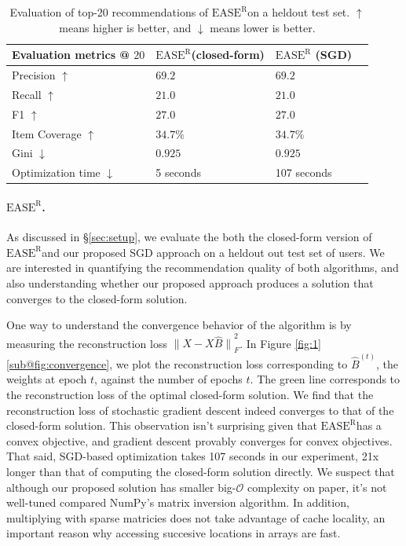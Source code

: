 \documentclass{article}
\newcommand{\easer}{$\text{EASE}^\text{R}$}
\newcommand{\norm}[1]{\ensuremath{\lVert #1 \rVert}}
\newcommand{\secref}[1]{\S\ref{#1}}
\begin{document}
\begin{table}[h]
	\centering
	\begin{tabular}{@{}llll@{}}
		\toprule
		Evaluation metrics @ $20$     & \easer (closed-form) & \easer
		(SGD)
		\\ \midrule
		Precision $\uparrow$          & $69.2$               & $69.2$
		\\
		Recall	$\uparrow$              & $21.0$               &
		$21.0$
		\\
		F1	$\uparrow$                  & $27.0$               &
		$27.0$
		\\
		Item Coverage	$\uparrow$       & $34.7\%$             &
		$34.7\%$
		\\
		Gini	$\downarrow$              & $0.925$              &
		$0.925$
		\\
		Optimization time	$\downarrow$ & 5 seconds
		                              & 107 seconds
		\\ \bottomrule
	\end{tabular}
	\caption{Evaluation of top-20 recommendations of \easer on a heldout
		test set. $\uparrow$ means higher is better, and $\downarrow$
		means
		lower is better.}
	\label{tab:easer-results}

\end{table}

\paragraph*{\easer.}
As discussed in \secref{sec:setup}, we evaluate the both the closed-form
 version of \easer and our proposed SGD approach on a heldout out test set of
 users.
We are interested in quantifying the recommendation quality of both algorithms,
 and also understanding whether our proposed approach produces a solution that
 converges to the closed-form solution.

One way to understand the convergence behavior of the algorithm is by measuring
 the reconstruction loss $\norm{X - X \hat{B}}_F^2$.
In Figure \ref{fig:1}\ref{sub@fig:convergence}, we plot the reconstruction loss
 corresponding to $\hat{B}^{(t)}$, the weights at epoch $t$, against the number
 of epochs $t$.
The green line corresponds to the reconstruction loss of the optimal
 closed-form solution.
We find that the reconstruction loss of stochastic gradient descent indeed
 converges to that of the closed-form solution.
This observation isn't surprising given that \easer has a convex objective, and
 gradient descent provably converges for convex objectives.
That said, SGD-based optimization takes 107 seconds in our experiment, 21x
 longer than that of computing the closed-form solution directly.
We suspect that although our proposed solution has smaller big-$\mathcal{O}$
 complexity on paper, it's not well-tuned compared  NumPy's matrix inversion
 algorithm.
In addition, multiplying with sparse matricies does not take advantage of cache
 locality, an important reason why accessing succesive locations in arrays are
 fast.
\end{document}

